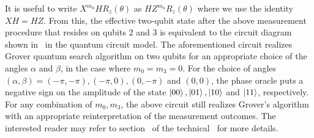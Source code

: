 





\bigskip
\noindent
It is useful to write $X^{m_a} H R_z(\theta)$ as $H Z^{m_a} R_z(\theta)$ where we use the identity $X H = H Z$. From this, the effective two-qubit state after the above measurement procedure that resides on qubits $2$ and $3$ is equivalent to the circuit diagram shown in~ in the quantum circuit model. The aforementioned circuit realizes Grover quantum search algorithm on two qubits for an appropriate choice of the angles $\alpha$ and $\beta$, in the case where $m_0=m_3=0$. For the choice of angles $(\alpha, \beta) = (-\pi,-\pi), (-\pi, 0), (0,-\pi)$ and $(0,0)$, the phase oracle puts a negative sign on the amplitude of the state $\ket{00}, \ket{01}, \ket{10}$ and $\ket{11}$, respectively. For any combination of $m_0,m_3$, the above circuit still realizes Grover's algorithm with an appropriate reinterpretation of the measurement outcomes. The interested reader may refer to section~ of the technical~ for more details.

